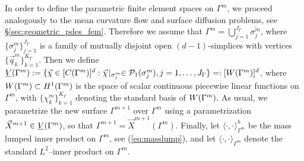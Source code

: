 In order to define the parametric finite element spaces on $\Gamma^m$, we
proceed analogously to the mean curvature flow and surface diffusion problems,
see \S\ref{sec:geometric_pdes_fem}. Therefore we assume that
$\Gamma^m=\bigcup_{j=1}^{J_\Gamma} \overline{\sigma^m_j}$, where
$\{\sigma^m_j\}_{j=1}^{J_\Gamma}$ is a family of mutually disjoint open
$(d-1)$-simplices with vertices $\{\vec q^m_k\}_{k=1}^{K_\Gamma}$. Then
we define $\underline{V}(\Gamma^m) := \{\vec\chi \in [C(\Gamma^m)]^d:\vec\chi\!\mid_{\sigma^m_j}
\in \mathcal{P}_1(\sigma^m_j), j=1,\ldots, J_\Gamma\} =: [W(\Gamma^m)]^d$, where $W(\Gamma^m)
\subset H^1(\Gamma^m)$ is the space of scalar continuous piecewise linear
functions on $\Gamma^m$, with $\{\chi^m_k\}_{k=1}^{K_\Gamma}$ denoting the
standard basis of $W(\Gamma^m)$. As usual, we parametrize the new surface
$\Gamma^{m+1}$ over $\Gamma^m$ using a parametrization $\vec X^{m+1} \in \underline{V}(\Gamma^m)$,
so that $\Gamma^{m+1} = \vec X^{m+1}(\Gamma^m)$. Finally, let
$\langle\cdot,\cdot\rangle_{\Gamma^m}^h$ be the mass lumped inner product on
$\Gamma^m$, see (\ref{eq:masslump}), and let
$\langle\cdot,\cdot\rangle_{\Gamma^m}$ denote the standard $L^2$--inner product
on $\Gamma^m$.

